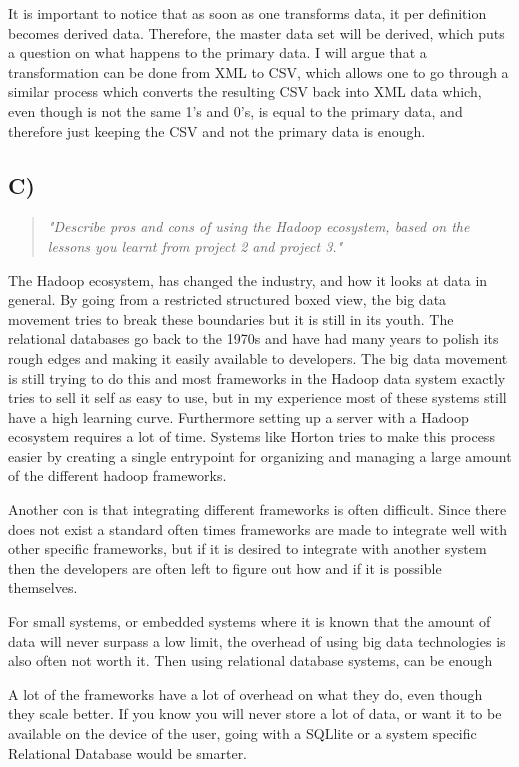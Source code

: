 It is important to notice that as soon as one transforms data, it per definition becomes derived data. Therefore, the master data set will be derived, which puts a question on what happens to the primary data. I will argue that a transformation can be done from XML to CSV, which allows one to go through a similar process which converts the resulting CSV back into XML data which, even though is not the same 1's and 0's, is equal to the primary data, and therefore just keeping the CSV and not the primary data is enough.

\subsection{C)}
\begin{quote}
	\textit{"Describe	pros	and	cons	of	using	the	Hadoop	ecosystem,	based	on	the	lessons	you	learnt	from	project	2	and	project	3."}
\end{quote}

The Hadoop ecosystem, has changed the industry, and how it looks at data in general. By going from a restricted structured boxed view, the big data movement tries to break these boundaries but it is still in its youth. The relational databases go back to the 1970s and have had many years to polish its rough edges and making it easily available to developers. The big data movement is still trying to do this and most frameworks in the Hadoop data system exactly tries to sell it self as easy to use, but in my experience most of these systems still have a high learning curve. Furthermore setting up a server with a Hadoop ecosystem requires a lot of time. Systems like Horton tries to make this process easier by creating a single entrypoint for organizing and managing a large amount of the different hadoop frameworks. 

Another con is that integrating different frameworks is often difficult. Since there does not exist a standard often times frameworks are made to integrate well with other specific frameworks, but if it is desired to integrate with another system then the developers are often left to figure out how and if it is possible themselves.

For small systems, or embedded systems where it is known that the amount of data will never surpass a low limit, the overhead of using big data technologies is also often not worth it. Then using relational database systems, can be enough 

A lot of the frameworks have a lot of overhead on what they do, even though they scale better. If you know you will never store a lot of data, or want it to be available on the device of the user, going with a SQLlite or a system specific Relational Database would be smarter.


